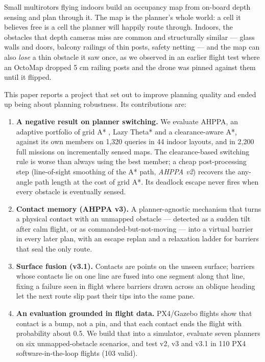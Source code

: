 \documentclass[
]{article}
\providecommand{\tightlist}{%
  \setlength{\itemsep}{0pt}\setlength{\parskip}{0pt}}
\begin{document}
Small multirotors flying indoors build an occupancy map from on-board
depth sensing and plan through it. The map is the planner's whole world:
a cell it believes free is a cell the planner will happily route
through. Indoors, the obstacles that depth cameras miss are common and
structurally similar --- glass walls and doors, balcony railings of thin
posts, safety netting --- and the map can also \emph{lose} a thin
obstacle it saw once, as we observed in an earlier flight test where an
OctoMap dropped 5 cm railing posts and the drone was pinned against them
until it flipped.

This paper reports a project that set out to improve planning quality
and ended up being about planning robustness. Its contributions are:

\begin{enumerate}
\def\labelenumi{\arabic{enumi}.}
\tightlist
\item
  \textbf{A negative result on planner switching.} We evaluate AHPPA, an
  adaptive portfolio of grid A* \autocite{hart1968astar}, Lazy Theta*
  \autocite{nash2010lazy} and a clearance-aware A*, against its own
  members on 1,320 queries in 44 indoor layouts, and in 2,200 full
  missions on incrementally sensed maps. The clearance-based switching
  rule is worse than always using the best member; a cheap
  post-processing step (line-of-sight smoothing of the A* path,
  \emph{AHPPA v2}) recovers the any-angle path length at the cost of
  grid A*. Its deadlock escape never fires when every obstacle is
  eventually sensed.
\item
  \textbf{Contact memory (AHPPA v3).} A planner-agnostic mechanism that
  turns a physical contact with an unmapped obstacle --- detected as a
  sudden tilt after calm flight, or as commanded-but-not-moving --- into
  a virtual barrier in every later plan, with an escape replan and a
  relaxation ladder for barriers that seal the only route.
\item
  \textbf{Surface fusion (v3.1).} Contacts are points on the unseen
  surface; barriers whose contacts lie on one line are fused into one
  segment along that line, fixing a failure seen in flight where
  barriers drawn across an oblique heading let the next route slip past
  their tips into the same pane.
\item
  \textbf{An evaluation grounded in flight data.} PX4/Gazebo flights
  show that contact is a bump, not a pin, and that each contact ends the
  flight with probability about 0.5. We build that into a simulator,
  evaluate seven planners on six unmapped-obstacle scenarios, and test
  v2, v3 and v3.1 in 110 PX4 software-in-the-loop flights (103 valid).
\end{enumerate}
\end{document}
